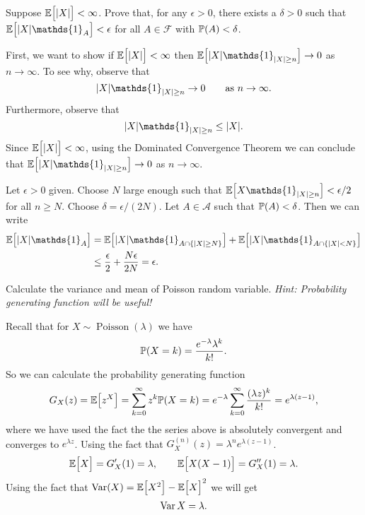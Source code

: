 \begin{problem}
	Suppose $ \mathbb{E}\big[|X|\big] < \infty $. Prove that, for any $ \epsilon>0 $, there exists a $ \delta>0 $ such that $ \E{\abs{X}\mathds{1}_{A}}<\epsilon $ for all $ A\in \mathcal{F} $ with $ \mathbb{P}(A)<\delta $.
\end{problem}
\begin{solution}
	First, we want to show if $ \mathbb{E}\big[|X|\big] <\infty$ then $ \E{\abs{X}\mathds{1}_{\abs{X}\geq n}} \to 0 $ as $ n\to\infty $. To see why, observe that
	\[ \abs{X}\mathds{1}_{\abs{X}\geq n} \to 0 \qquad \text{as $ n\to\infty $}. \]
	Furthermore, observe that
	\[ \abs{X}\mathds{1}_{\abs{X}\geq n} \leq \abs{X}. \]
	Since $ \mathbb{E}\big[|X|\big] < \infty $, using the Dominated Convergence Theorem we can conclude that $ \E{\abs{X}\mathds{1}_{\abs{X}\geq n}} \to 0 $ as $ n\to\infty $.
	
	Let $ \epsilon>0 $ given. Choose $ N $ large enough such that $ \E{X\mathds{1}_{\abs{X}\geq n}}<\epsilon/2 $ for all $ n\geq N $. Choose $ \delta = \epsilon/(2N) $. Let $ A\in \mathcal{A} $ such that $ \mathbb{P}(A) < \delta $. Then we can write
	\begin{align*}
		\E{\abs{X}\mathds{1}_A} &= \E{\abs{X}\mathds{1}_{A\cap\set{\abs{X}\geq N}}} + \E{\abs{X}\mathds{1}_{A\cap\set{\abs{X}<N}}} \\
		&\leq \frac{\epsilon}{2} + \frac{N\epsilon}{2N} = \epsilon.
	\end{align*}
\end{solution}

\begin{problem}
	Calculate the variance and mean of Poisson random variable. \emph{Hint: Probability generating function will be useful!}
\end{problem}
\begin{solution}
	Recall that for $ X\sim \operatorname{Poisson}(\lambda) $ we have
	\[ \mathbb{P}(X = k) = \frac{e^{-\lambda}\lambda^k}{k!}. \]
	So we can calculate the probability generating function
	\[ G_X(z) = \mathbb{E}\big[z^X\big] = \sum_{k=0}^{\infty}z^k\mathbb{P}(X=k) = e^{-\lambda}\sum_{k=0}^{\infty}\frac{(\lambda z)^k}{k!} = e^{\lambda(z-1)}, \]
	where we have used the fact the the series above is absolutely convergent and converges to $ e^{\lambda z} $. Using the fact that $ G_X^{(n)}(z)  = \lambda^n e^{\lambda(z-1)}$.
	\[ \mathbb{E}\big[X\big] = G_X'(1) = \lambda, \qquad \mathbb{E}\big[X(X-1)\big]=G_X''(1) = \lambda. \]
	Using the fact that $ \operatorname{Var}(X) = \mathbb{E}\big[X^2\big] - \mathbb{E}\big[X\big]^2 $ we will get
	\[ \operatorname{Var}{X} = \lambda. \]
\end{solution}

